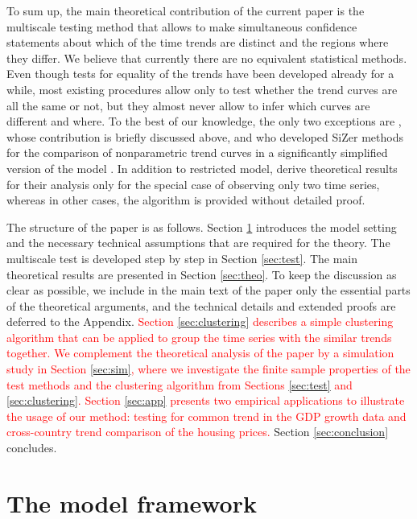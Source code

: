 \documentclass[a4paper,12pt]{article}
\makeatletter
\renewcommand{\eqref}[1]{\tagform@{\ref{#1}}}
\makeatother
\begin{document}
To sum up, the main theoretical contribution of the current paper is the multiscale testing method that allows to make simultaneous confidence statements about which of the time trends are distinct and the regions where they differ. We believe that currently there are no equivalent statistical methods. Even though tests for equality of the trends have been developed already for a while, most existing procedures allow only to test whether the trend curves are all the same or not, but they almost never allow to infer which curves are different and where. To the best of our knowledge, the only two exceptions are \cite{KhismatullinaVogt2021}, whose contribution is briefly discussed above, and \cite{Park2009} who developed SiZer methods for the comparison of nonparametric trend curves in a significantly simplified version of the model \eqref{eq:model}. In addition to restricted model, \cite{Park2009} derive theoretical results for their analysis only for the special case of observing only two time series, whereas in other cases, the algorithm is provided without detailed proof.

The structure of the paper is as follows. Section \ref{sec:model} introduces the model setting and the necessary technical assumptions that are required for the theory. The multiscale test is developed step by step in Section \ref{sec:test}. The main theoretical results are presented in Section \ref{sec:theo}. To keep the discussion as clear as possible, we include in the main text of the paper only the essential parts of the theoretical arguments, and the technical details and extended proofs are deferred to the Appendix. \textcolor{red}{Section \ref{sec:clustering} describes a simple clustering algorithm that can be applied to group the time series with the similar trends together. We complement the theoretical analysis of the paper by a simulation study in Section \ref{sec:sim}, where we investigate the finite
sample properties of the test methods and the clustering algorithm from Sections \ref{sec:test} and \ref{sec:clustering}. Section \ref{sec:app} presents two empirical applications to illustrate the usage of our method: testing for common trend in the GDP growth data and cross-country trend comparison of the housing prices.} Section \ref{sec:conclusion} concludes.



\section{The model framework}\label{sec:model}
\end{document}
